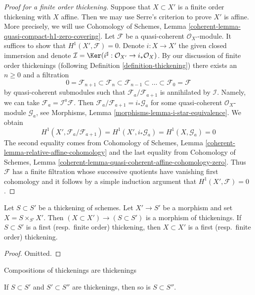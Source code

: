 \begin{proof}[Proof for a finite order thickening]
Suppose that $X \subset X'$ is a finite order thickening with $X$ affine. Then
we may use Serre's criterion to prove $X'$ is affine. More precisely, we will
use Cohomology of Schemes, Lemma
\ref{coherent-lemma-quasi-compact-h1-zero-covering}. Let $\mathcal{F}$ be a
quasi-coherent $\mathcal{O}_{X'}$-module. It suffices to show that
$H^1(X', \mathcal{F}) = 0$. Denote $i : X \to X'$ the given closed immersion
and denote
$\mathcal{I} = \Ker(i^\sharp : \mathcal{O}_{X'} \to i_*\mathcal{O}_X)$.
By our discussion of finite order thickenings (following
Definition \ref{definition-thickening}) there exists an $n \geq 0$
and a filtration
$$
0 = \mathcal{F}_{n + 1} \subset \mathcal{F}_n \subset
\mathcal{F}_{n - 1} \subset \ldots \subset
\mathcal{F}_0 = \mathcal{F}
$$
by quasi-coherent submodules such that $\mathcal{F}_a/\mathcal{F}_{a + 1}$ is
annihilated by $\mathcal{I}$. Namely, we can take
$\mathcal{F}_a = \mathcal{I}^a\mathcal{F}$. Then
$\mathcal{F}_a/\mathcal{F}_{a + 1} = i_*\mathcal{G}_a$ for some quasi-coherent
$\mathcal{O}_X$-module $\mathcal{G}_a$, see Morphisms, Lemma
\ref{morphisms-lemma-i-star-equivalence}. We obtain
$$
H^1(X', \mathcal{F}_a/\mathcal{F}_{a + 1}) =
H^1(X', i_*\mathcal{G}_a) = H^1(X, \mathcal{G}_a) = 0
$$
The second equality comes from Cohomology of Schemes, Lemma
\ref{coherent-lemma-relative-affine-cohomology}
and the last equality from Cohomology of Schemes, Lemma
\ref{coherent-lemma-quasi-coherent-affine-cohomology-zero}.
Thus $\mathcal{F}$ has a finite filtration whose successive quotients
have vanishing first cohomology and it follows by a simple
induction argument that $H^1(X', \mathcal{F}) = 0$.
\end{proof}

\begin{lemma}
\label{lemma-base-change-thickening}
Let $S \subset S'$ be a thickening of schemes. Let $X' \to S'$ be a morphism
and set $X = S \times_{S'} X'$. Then $(X \subset X') \to (S \subset S')$
is a morphism of thickenings. If $S \subset S'$ is a first
(resp.\ finite order) thickening, then $X \subset X'$ is a first
(resp.\ finite order) thickening.
\end{lemma}

\begin{proof}
Omitted.
\end{proof}

\begin{lemma}
\label{lemma-composition-thickening}
\begin{slogan}
Compositions of thickenings are thickenings
\end{slogan}
If $S \subset S'$ and $S' \subset S''$ are thickenings, then so is
$S \subset S''$.
\end{lemma}

